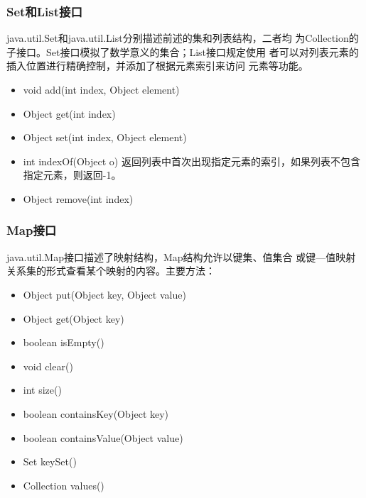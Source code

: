 \begin{frame}[fragile] %
  \frametitle{Set和List接口}

  \begin{block}{}
    java.util.Set和java.util.List分别描述前述的集和列表结构，二者均
    为Collection的子接口。Set接口模拟了数学意义的集合；List接口规定使用
    者可以对列表元素的插入位置进行精确控制，并添加了根据元素索引来访问
    元素等功能。
  \end{block}

  \pause
  

  \begin{itemize}[<+-| alert@+>]\kai
  \item void add(int index, Object element)
  \item Object get(int index)
  \item Object set(int index, Object element) 
  \item int indexOf(Object o) 返回列表中首次出现指定元素的索引，如果列表不包含指定元素，则返回-1。
  \item Object remove(int index)
  \end{itemize}
\end{frame}

\begin{frame}[fragile] %
  \frametitle{Map接口}

  java.util.Map接口描述了映射结构，Map结构允许以{\hei\Blue 键集、值集合
    或键—值映射关系集}的形式查看某个映射的内容。主要方法：
  
  \begin{itemize}[<+-| alert@+>]\kai
  \item Object put(Object key, Object value)\\
  \item Object get(Object key)\\
  \item boolean isEmpty()
  \item void clear()
  \item int size()
  \item boolean containsKey(Object key)\\
  \item boolean containsValue(Object value)
  \item Set keySet()\\
  \item Collection values()\\
  \end{itemize}
\end{frame}

